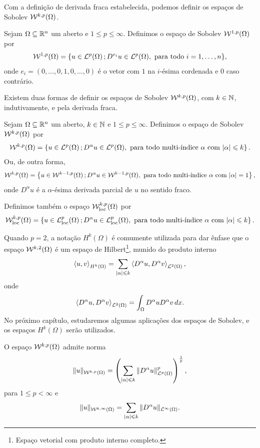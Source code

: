 Com a definição de derivada fraca estabelecida, podemos definir os espaços de Sobolev $\mathcal{W}^{k,p}(\Omega)$.

\begin{dbox}
    Sejam $\Omega \subseteq \mathbb{R}^n$ um aberto e $1 \leqslant p \leqslant \infty$. 
    Definimos o espaço de Sobolev $\mathcal{W}^{1,p}(\Omega)$ por
    \[
        \mathcal{W}^{1,p}(\Omega) = \{u \in \mathcal{L}^p(\Omega) \,; D^{e_i} u \in \mathcal{L}^p(\Omega), \text{ para todo } i = 1,\dots,n\},
    \]
    onde $e_i = (0,\dots,0,1,0,\dots,0)$ é o vetor com $1$ na $i$-ésima cordenada e $0$ caso contrário.
\end{dbox}

Existem duas formas de definir os espaços de Sobolev $\mathcal{W}^{k,p}(\Omega)$, com $k \in \mathbb{N}$, indutivamente, e pela derivada fraca.

\begin{dbox}
    Sejam $\Omega \subseteq \mathbb{R} ^n$ um aberto, $k \in \mathbb{N}$ e $1 \leqslant p \leqslant \infty$. Definimos o espaço de Sobolev $\mathcal{W}^{k,p}(\Omega)$ por
    \[
        \mathcal{W}^{k,p}(\Omega) = \left\{ u \in \mathcal{L}^p(\Omega) \,; D^\alpha u \in \mathcal{L}^p(\Omega), \text{ para todo multi-índice } \alpha \text{ com } |\alpha| \leqslant k\right\}.
    \]
    Ou, de outra forma,
    \[
        \mathcal{W}^{k,p}(\Omega) = \left\{ u \in \mathcal{W}^{k-1,p}(\Omega) \,; D^\alpha u \in \mathcal{W}^{k-1,p}(\Omega) , \text{ para todo multi-índice } \alpha \text{ com } |\alpha| = 1\right\},
    \]
    onde $D^\alpha u$ é a $\alpha$-ésima derivada parcial de $u$ no sentido fraco.
\end{dbox}

\obs Definimos também o espaço $\mathcal{W}^{k,p}_{\mathrm{loc}}(\Omega)$ por
\[
    \mathcal{W}^{k,p}_{\mathrm{loc}}(\Omega) = \left\{ u \in \mathcal{L}^p_{\mathrm{loc}}(\Omega) \,; D^\alpha u \in \mathcal{L}^p_{\mathrm{loc}}(\Omega), \text{ para todo multi-índice } \alpha \text{ com } |\alpha| \leqslant k\right\}.
\]

\obs Quando $p = 2$, a notação $H^{k}(\Omega)$ é comumente utilizada para dar ênfase que o espaço $\mathcal{W}^{k,2}(\Omega)$ é um espaço de Hilbert\footnote{Espaço vetorial com produto interno completo.}, munido do produto interno
\[
    \left\langle u, v\right\rangle _{H^k(\Omega)} = \sum_{|\alpha| \leqslant k} \left\langle D^\alpha u, D^\alpha v\right\rangle _{\mathcal{L}^2(\Omega)},
\]
onde
\[
    \left\langle D^\alpha u, D^\alpha v\right\rangle _{\mathcal{L}^2(\Omega)} = \int_\Omega D^\alpha u D^\alpha v \,dx.
\]
No próximo capítulo, estudaremos algumas aplicações dos espaços de Sobolev, e os espaços $H^k(\Omega)$ serão utilizados.

\begin{dbox}
    O espaço $\mathcal{W}^{k,p}(\Omega)$ admite norma
    \[
        \Vert u \Vert_{\mathcal{W}^{k,p}(\Omega)} = \left( \sum_{|\alpha| \leqslant k} \Vert D^\alpha u \Vert_{\mathcal{L}^p(\Omega)}^p \right)^{\frac{1}{p}},
    \]
    para $1 \leqslant p < \infty$ e 
    \[
        \Vert u \Vert_{\mathcal{W}^{k,\infty}(\Omega)} 
        = \sum_{|\alpha| \leqslant k} \Vert D^{\alpha}u \Vert_{\mathcal{L}^\infty(\Omega)}.
    \]
\end{dbox}

